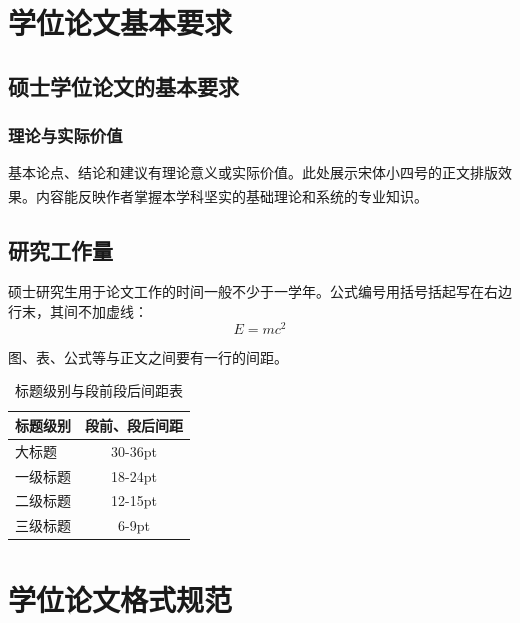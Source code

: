 \documentclass[a4paper, twoside, openright, 12pt]{ctexbook}
\newcommand{\upcite}[1]{\textsuperscript{\songti\cite{#1}}} %
\begin{document}
\pagestyle{plain} 

{\songti{}    %
    \tableofcontents
}
\cleardoublepage

\mainmatter
\pagestyle{fancy}

\songti %
\setlength{\baselineskip}{20pt} %

\chapter{学位论文基本要求}
\section{硕士学位论文的基本要求}
\subsection{理论与实际价值}
基本论点、结论和建议有理论意义或实际价值。此处展示宋体小四号的正文排版效果。内容能反映作者掌握本学科坚实的基础理论和系统的专业知识。\upcite{Zheng_image_2011}

\section{研究工作量}
硕士研究生用于论文工作的时间一般不少于一学年。公式编号用括号括起写在右边行末，其间不加虚线：
\begin{equation}
    E = mc^2
\end{equation}

图、表、公式等与正文之间要有一行的间距。
\begin{table}[htbp]
    \centering
    \caption{标题级别与段前段后间距表}
    \begin{tabular}{lc}
        \hline
        标题级别 & 段前、段后间距 \\
        \hline
        大标题 & 30-36pt \\
        一级标题 & 18-24pt \\
        二级标题 & 12-15pt \\
        三级标题 & 6-9pt \\
        \hline
    \end{tabular}
\end{table}

\chapter{学位论文格式规范}
\end{document}
